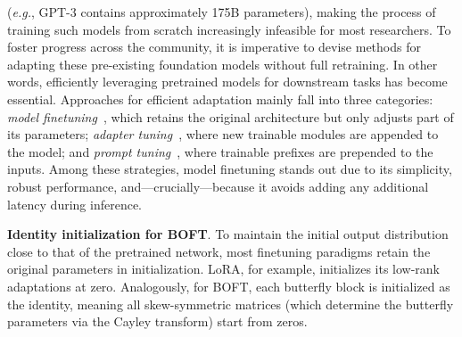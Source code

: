 

(\emph{e.g.}, GPT-3 contains approximately 175B parameters), making the process of training such models from scratch increasingly infeasible for most researchers. To foster progress across the community, it is imperative to devise methods for adapting these pre-existing foundation models without full retraining. In other words, efficiently leveraging pretrained models for downstream tasks has become essential. Approaches for efficient adaptation mainly fall into three categories: \emph{model finetuning}~\cite{hulora2022,zaken2022bitfit,guo2020parameter,raffel2020exploring,qiu2023controlling,zhang2022adaptive,chavan2023one}, which retains the original architecture but only adjusts part of its parameters; \emph{adapter tuning}~\cite{rebuffi2017learning,houlsby2019parameter,pfeiffer2020adapterfusion,lin2020exploring,he2021towards}, where new trainable modules are appended to the model; and \emph{prompt tuning}~\cite{li2021prefix,lester2021power}, where trainable prefixes are prepended to the inputs. Among these strategies, model finetuning stands out due to its simplicity, robust performance, and—crucially—because it avoids adding any additional latency during inference.

\textbf{Identity initialization for BOFT}. To maintain the initial output distribution close to that of the pretrained network, most finetuning paradigms retain the original parameters in initialization. LoRA, for example, initializes its low-rank adaptations at zero. Analogously, for BOFT, each butterfly block is initialized as the identity, meaning all skew-symmetric matrices (which determine the butterfly parameters via the Cayley transform) start from zeros.

